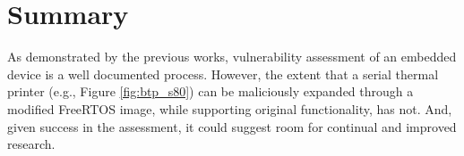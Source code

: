 \section{Summary}

As demonstrated by the previous works, vulnerability assessment of an embedded device is a well documented process. However, the extent that a serial thermal printer (e.g., Figure \ref{fig:btp_s80}) can be maliciously expanded through a modified FreeRTOS image, while supporting original functionality, has not. And, given success in the assessment, it could suggest room for continual and improved research.